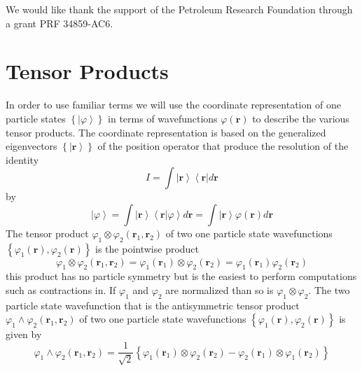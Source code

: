 \documentclass[aps,preprint]{revtex4}%
\begin{document}
We would like thank the support of the Petroleum Research Foundation through a
grant PRF 34859-AC6.

\appendix

\section{Tensor Products\label{tensor}}

In order to use familiar terms we will use the coordinate representation of
one particle states $\left\{  \left\vert \varphi\right\rangle \right\}  $ in
terms of wavefunctions $\varphi\left(  \mathbf{r}\right)  $ to describe the
various tensor products. The coordinate representation is based on the
generalized eigenvectors $\left\{  \left\vert \mathbf{r}\right\rangle
\right\}  $ of the position operator that produce the resolution of the
identity
\begin{equation}
I=\int\left\vert \mathbf{r}\right\rangle \left\langle \mathbf{r}\right\vert
d\mathbf{r}%
\end{equation}
by%
\begin{equation}
\left\vert \varphi\right\rangle =\int\left\vert \mathbf{r}\right\rangle
\left\langle \mathbf{r}|\varphi\right\rangle d\mathbf{r=}\int\left\vert
\mathbf{r}\right\rangle \varphi\left(  \mathbf{r}\right)  d\mathbf{r}%
\end{equation}
The tensor product $\varphi_{1}\otimes\varphi_{2}\left(  \mathbf{r}%
_{1},\mathbf{r}_{2}\right)  $ of two one particle state wavefunctions
$\left\{  \varphi_{1}\left(  \mathbf{r}\right)  ,\varphi_{2}\left(
\mathbf{r}\right)  \right\}  $ is the pointwise product
\begin{equation}
\varphi_{1}\otimes\varphi_{2}\left(  \mathbf{r}_{1},\mathbf{r}_{2}\right)
=\varphi_{1}\left(  \mathbf{r}_{1}\right)  \otimes\varphi_{2}\left(
\mathbf{r}_{2}\right)  =\varphi_{1}\left(  \mathbf{r}_{1}\right)  \varphi
_{2}\left(  \mathbf{r}_{2}\right)
\end{equation}
this product has no particle symmetry but is the easiest to perform
computations such as contractions in. If $\varphi_{1}$ and $\varphi_{2}$ are
normalized than so is $\varphi_{1}\otimes\varphi_{2}$. The two particle state
wavefunction that is the antisymmetric tensor product $\varphi_{1}%
\wedge\varphi_{2}\left(  \mathbf{r}_{1},\mathbf{r}_{2}\right)  $ of two one
particle state wavefunctions $\left\{  \varphi_{1}\left(  \mathbf{r}\right)
,\varphi_{2}\left(  \mathbf{r}\right)  \right\}  $ is given by
\begin{equation}
\varphi_{1}\wedge\varphi_{2}\left(  \mathbf{r}_{1},\mathbf{r}_{2}\right)
=\frac{1}{\sqrt{2}}\left\{  \varphi_{1}\left(  \mathbf{r}_{1}\right)
\otimes\varphi_{2}\left(  \mathbf{r}_{2}\right)  -\varphi_{2}\left(
\mathbf{r}_{1}\right)  \otimes\varphi_{1}\left(  \mathbf{r}_{2}\right)
\right\}  \label{aten}%
\end{equation}
\end{document}
